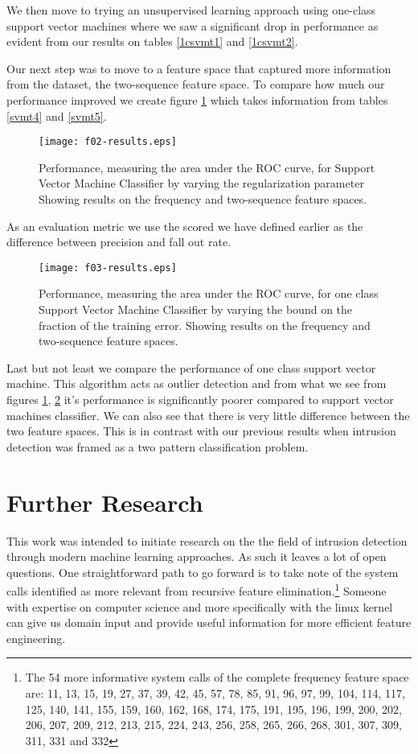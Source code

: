 \documentclass[reqno,openany,12pt]{amsbook}
\begin{document}
We then move to trying an unsupervised learning approach using one-class support vector machines where we saw a significant drop in performance as evident from our results on tables \ref{1csvmt1} and \ref{1csvmt2}.

Our next step was to move to a feature space that captured more information from the dataset, the two-sequence feature space. To compare how much our performance improved we create figure \ref{res2} which takes information from tables \ref{svmt4} and \ref{svmt5}.
\begin{figure}[htb]
\texttt{[image: f02-results.eps]}
\caption[Performance of SVM classifier]{Performance, measuring the area under the ROC curve, for Support Vector Machine Classifier by varying the regularization parameter Showing results  on the frequency and two-sequence feature spaces.}
\label{res2}
\end{figure}
As an evaluation metric we use the scored we have defined earlier as the difference between precision and fall out rate.

\begin{figure}[htb]
\texttt{[image: f03-results.eps]}
\caption[Performance of one-class SVM classifier]{Performance, measuring the area under the ROC curve, for one class Support Vector Machine Classifier by varying the bound on the fraction of the training error. Showing results on the frequency and two-sequence feature spaces.}
\label{res3}
\end{figure}
Last but not least we compare the performance of one class support vector machine. This algorithm acts as outlier detection and from what we see from figures \ref{res2}, \ref{res3} it's performance is significantly poorer compared to support vector machines classifier. We can also see that there is very little difference between the two feature spaces. This is in contrast with our previous results when intrusion detection was framed as a two pattern classification problem.

\section{Further Research}


This work was intended to initiate research on the the field of intrusion detection through modern machine learning approaches. As such it leaves a lot of open questions.
One straightforward path to go forward is to take note of the system calls identified as more relevant from recursive feature elimination.\footnote{The 54 more informative system calls of the complete frequency feature space are:
11, 13, 15, 19, 27, 37, 39, 42, 45, 57, 78, 85, 91, 96, 97, 99, 104, 114, 117, 125, 140, 141, 155,
159, 160, 162, 168, 174, 175, 191, 195, 196, 199, 200, 202, 206, 207, 209, 212, 213, 215, 224, 243,
256, 258, 265, 266, 268, 301, 307, 309, 311, 331 and 332}
Someone with expertise on computer science and more specifically with the linux kernel can give us domain input and provide useful information for more efficient feature engineering.
\end{document}
